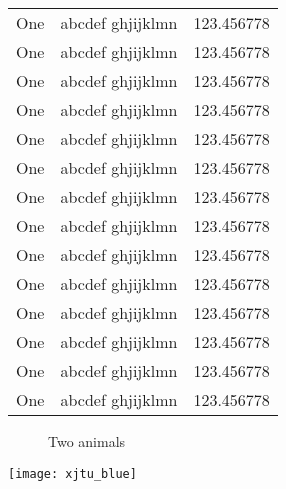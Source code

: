 \begin{ThreePartTable}
\begin{xltabular}{\linewidth}{@{}YYY@{}}
One & abcdef ghjijklmn & 123.456778 \\
One & abcdef ghjijklmn & 123.456778 \\
One & abcdef ghjijklmn & 123.456778 \\
One & abcdef ghjijklmn & 123.456778 \\
One & abcdef ghjijklmn & 123.456778 \\
One & abcdef ghjijklmn & 123.456778 \\
One & abcdef ghjijklmn & 123.456778 \\
One & abcdef ghjijklmn & 123.456778 \\
One & abcdef ghjijklmn & 123.456778 \\
One & abcdef ghjijklmn & 123.456778 \\
One & abcdef ghjijklmn & 123.456778 \\
One & abcdef ghjijklmn & 123.456778 \\
One & abcdef ghjijklmn & 123.456778 \\
One & abcdef ghjijklmn & 123.456778 \\
\bottomrule[1.5pt]
\end{xltabular}
\end{ThreePartTable}



\begin{figure}
    \centering
    \hfill

    \hfill

    \hfill
    \caption{Two animals}
    \label{1122}
\end{figure}

\begin{mdframed}
\zhlipsum[1][name=zhufu]
\begin{center}
    \texttt{[image: xjtu\_blue]}
\end{center}
\zhlipsum[2][name=zhufu]
\end{mdframed}


